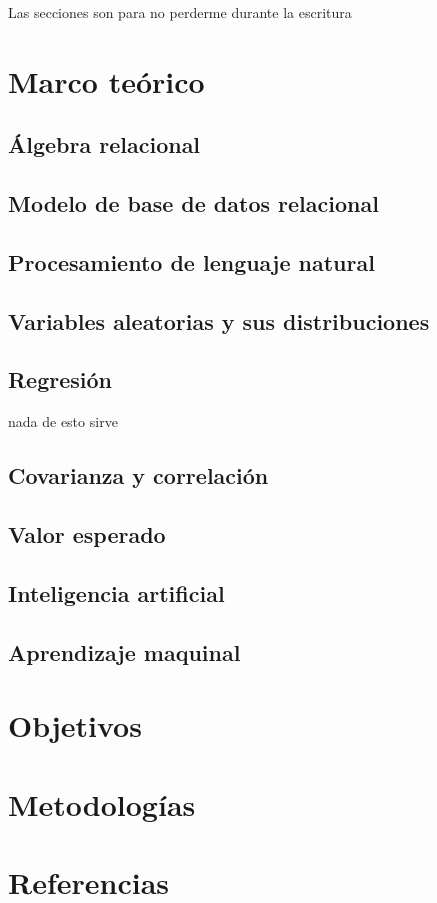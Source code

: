 \documentclass[12pt,letterpaper]{article}
\begin{document}
\maketitle
%
\tableofcontents
\pagebreak
Las secciones son para no perderme durante la escritura
\section {Marco teórico}\label{sec:marcot}
\subsection {Álgebra relacional}\label{subsec:algebra}
\subsection {Modelo de base de datos relacional}\label{subsch:rdb}
\subsection {Procesamiento de lenguaje natural}\label{subsec:nlp}
\subsection {Variables aleatorias y sus distribuciones}\label{subsec:vayd}
\subsection {Regresión}\label{subsec:reg} nada de esto sirve
\subsection {Covarianza y correlación}\label{subsec:reg1}
\subsection {Valor esperado}\label{subsec:valesp}
\subsection {Inteligencia artificial}\label{subsec:intela}
\subsection {Aprendizaje maquinal}\label{subsec:machinel}
\section {Objetivos}\label{sec:objetivos}
\section {Metodologías}\label{sec:metod}
\section {Referencias}\label{sec:refs}
\printbibliography[heading=none]
\end{document}
